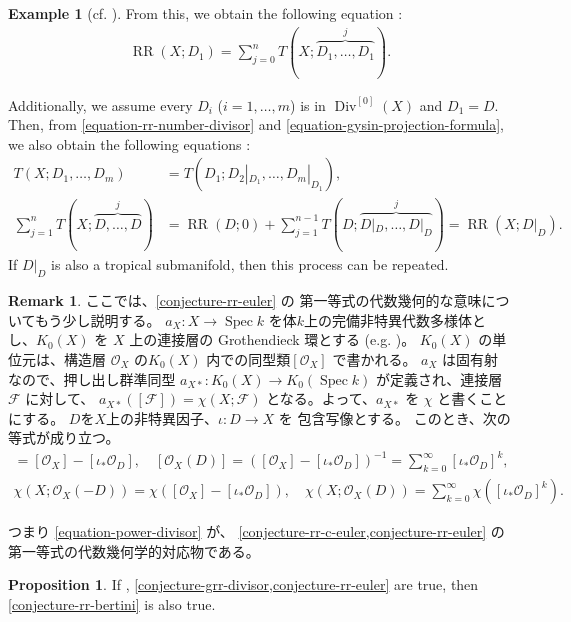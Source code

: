 \documentclass[a4paper,dvipdfmx,reqno,12pt]{amsart}
\theoremstyle{definition}
\newtheorem{example}[theorem]{Example}
\newtheorem{proposition}[theorem]{Proposition}
\newtheorem{remark}[theorem]{Remark}
\newcommand{\opn}[1]{\operatorname{#1}}
\numberwithin{equation}{section}
\begin{document}
\begin{example}[{cf. \cite[Chapter 13 Appendix]{MR2810322}}]
From this, we obtain the following equation
\cite[.(14)]{MR1335917}:
\begin{align}
\opn{RR}(X;D_1)=\sum_{j=0}^{n}T(X;\overbrace{D_1,\ldots,D_1}^{j}).
\end{align}

Additionally, we assume every $D_i$ ($i=1,\ldots,m$) is
in $\opn{Div}^{[0]}(X)$ and $D_1=D$.
Then, from 
\cref{equation-rr-number-divisor} and
\cref{equation-gysin-projection-formula},
we also obtain the following equations \cite[Theorem 11.2.1]{MR1335917}:
\begin{align}
T(X;D_1,\ldots,D_m)&=T(D_1;D_2|_{D_1},\ldots,D_m|_{D_1}), \\
\sum_{j=1}^{n}T(X;\overbrace{D,\ldots,D}^{j})
&=\opn{RR}(D;0)+\sum_{j=1}^{n-1}T(D;\overbrace{D|_D,\ldots,D|_{D}}^{j})
=\opn{RR}(X;D|_D).
\label{equation-rr-reduction}
\end{align}
If $D|_D$ is also a tropical submanifold,
then this process can be repeated.
\end{example}

\begin{remark}
\label{remark-grothendieck-group}
ここでは、\cref{conjecture-rr-euler} の
第一等式の代数幾何的な意味についてもう少し説明する。
$a_X\colon X\to \opn{Spec}k$
を体$k$上の完備非特異代数多様体とし、$K_0(X)$ を
$X$ 上の連接層の Grothendieck 環とする
(e.g. \cite[]{MR1644323})。
$K_0(X)$ の単位元は、構造層 $\mathcal{O}_X$ 
の$K_0(X)$ 内での同型類$[\mathcal{O}_X]$ で書かれる。
$a_X$ は固有射なので、押し出し群準同型
$a_{X*}\colon K_0(X)\to K_0(\opn{Spec}k)$
が定義され、連接層 $\mathcal{F}$ に対して、
$a_{X*}([\mathcal{F}])=
\chi(X;\mathcal{F})$
となる。よって、$a_{X*}$ を $\chi$ と書くことにする。
$D$を$X$上の非特異因子、$\iota\colon D\to X$ を
包含写像とする。
このとき、次の等式が成り立つ。
\begin{align}
[\mathcal{O}_X(-D)]=
[\mathcal{O}_X]-[\iota_*\mathcal{O}_{D}], \quad
[\mathcal{O}_X(D)]=
([\mathcal{O}_X]-[\iota_*\mathcal{O}_{D}])^{-1}
=\sum_{k=0}^{\infty}[\iota_*\mathcal{O}_D]^{k}, \\
\chi(X;\mathcal{O}_X(-D))=
\chi([\mathcal{O}_X]-[\iota_*\mathcal{O}_{D}]), \quad
\chi(X;\mathcal{O}_X(D))=
\sum_{k=0}^{\infty}\chi([\iota_*\mathcal{O}_D]^{k}).
\label{equation-power-divisor}
\end{align}
\end{remark}
つまり \cref{equation-power-divisor} が、
\cref{conjecture-rr-c-euler,conjecture-rr-euler}
の第一等式の代数幾何学的対応物である。
\begin{proposition}
If \label{proposition-euler-to-bertini}
\cite[Conjecture 6.13]{demedrano2023chern},
\cref{conjecture-grr-divisor,conjecture-rr-euler}
are true, then \cref{conjecture-rr-bertini} is also true. 
\end{proposition}
\end{document}
